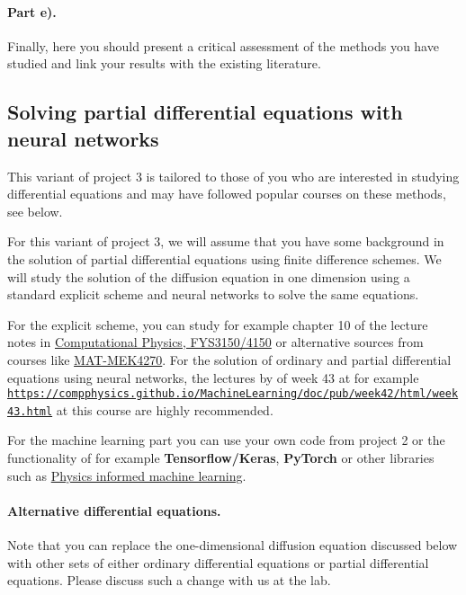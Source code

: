 \documentclass[%
oneside,                 %
final,                   %
10pt]{article}
\begin{document}
\paragraph{Part e).}
Finally, here you should present a critical assessment of the methods you have studied and link your results with the existing literature. 

\subsection{Solving partial differential equations with neural networks}

This variant of project 3 is tailored to those of you who are
interested in studying differential equations and may have followed
popular courses on these methods, see below.

For this variant of project 3, we will assume that you have some
background in the solution of partial differential equations using
finite difference schemes. We will study the solution of the diffusion
equation in one dimension using a standard explicit scheme and neural
networks to solve the same equations.

For the explicit scheme, you can study for example chapter 10 of the lecture notes in \href{{https://github.com/CompPhysics/ComputationalPhysics/blob/master/doc/Lectures/lectures2015.pdf}}{Computational Physics, FYS3150/4150} or alternative sources from courses like \href{{https://www.uio.no/studier/emner/matnat/math/MAT-MEK4270/index.html}}{MAT-MEK4270}. For the solution of ordinary and partial differential equations using neural networks, the lectures by of week 43 at for example \href{{https://compphysics.github.io/MachineLearning/doc/pub/week42/html/week43.html}}{\nolinkurl{https://compphysics.github.io/MachineLearning/doc/pub/week42/html/week43.html}} at this course are highly recommended.

For the machine learning part you can use your own code from project 2
or the functionality of for example \textbf{Tensorflow/Keras}, \textbf{PyTorch} or
other libraries such as \href{{https://maziarraissi.github.io/PINNs/}}{Physics informed machine learning}.

\paragraph{Alternative differential equations.}
Note that you can replace the one-dimensional diffusion equation discussed below with other sets of either ordinary differential equations or partial differential equations.
Please discuss such a change with us at the lab.
\end{document}
